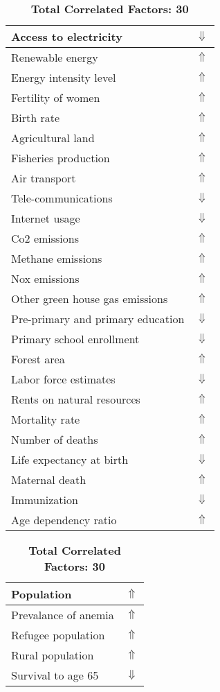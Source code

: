 \documentclass[12pt,notitlepage,oneside]{report}
\begin{document}
\begin{table}[!htb]
\caption{\textbf{Shows Symptom: Dark urine $\Uparrow$}}
\centering
\label{Correlated Socio-economic Factors0}
\begin{tabular}{|l|l|}
\hline
Access to electricity & $\Downarrow$\\ \hline
Renewable energy & $\Uparrow$\\ \hline
Energy intensity level & $\Uparrow$\\ \hline
Fertility of women & $\Uparrow$\\ \hline
Birth rate & $\Uparrow$\\ \hline
Agricultural land & $\Uparrow$\\ \hline
Fisheries production & $\Uparrow$\\ \hline
Air transport  & $\Uparrow$\\ \hline
Tele-communications & $\Downarrow$\\ \hline
Internet usage & $\Downarrow$\\ \hline
Co2 emissions & $\Uparrow$\\ \hline
Methane emissions & $\Uparrow$\\ \hline
Nox emissions & $\Uparrow$\\ \hline
Other green house gas emissions & $\Uparrow$\\ \hline
Pre-primary and primary education & $\Downarrow$\\ \hline
Primary school enrollment & $\Downarrow$\\ \hline
Forest area & $\Uparrow$\\ \hline
Labor force estimates & $\Downarrow$\\ \hline
Rents on natural resources & $\Uparrow$\\ \hline
Mortality rate & $\Uparrow$\\ \hline
Number of deaths & $\Uparrow$\\ \hline
Life expectancy at birth & $\Downarrow$\\ \hline
Maternal death & $\Uparrow$\\ \hline
Immunization & $\Downarrow$\\ \hline
Age dependency ratio & $\Uparrow$\\ \hline
\end{tabular}
\begin{tabular}{|l|l|}
\hline
Population & $\Uparrow$\\ \hline
Prevalance of anemia & $\Uparrow$\\ \hline
Refugee population & $\Uparrow$\\ \hline
Rural population & $\Uparrow$\\ \hline
Survival to age 65 & $\Downarrow$\\ \hline
\end{tabular}
\caption*{\textbf{Total Correlated Factors: 30}}
\end{table}
\end{document}
